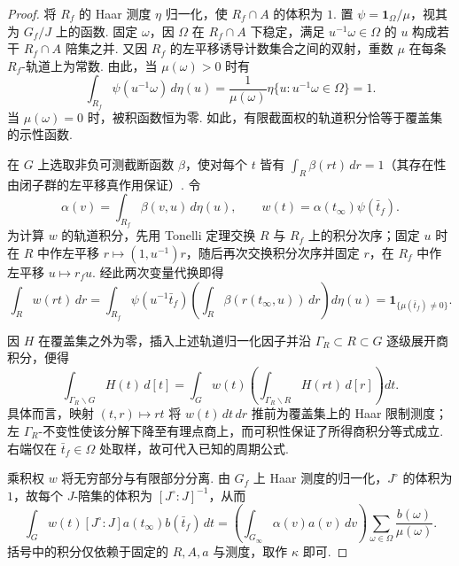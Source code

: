 \begin{proof}
将 $R_f$ 的 Haar 测度 $\eta$ 归一化，使 $R_f\cap A$ 的体积为 $1$. 置 $\psi=\mathbf 1_\Omega/\mu$，视其为 $G_f/J$ 上的函数. 固定 $\omega$，因 $\Omega$ 在 $R_f\cap A$ 下稳定，满足 $u^{-1}\omega\in\Omega$ 的 $u$ 构成若干 $R_f\cap A$ 陪集之并. 又因 $R_f$ 的左平移诱导计数集合之间的双射，重数 $\mu$ 在每条 $R_f$-轨道上为常数. 由此，当 $\mu(\omega)>0$ 时有
\[
 \int_{R_f}\psi(u^{-1}\omega)\,d\eta(u)
   =\frac{1}{\mu(\omega)}\eta\{u:u^{-1}\omega\in\Omega\}
   =1.
\]
当 $\mu(\omega)=0$ 时，被积函数恒为零. 如此，有限截面权的轨道积分恰等于覆盖集的示性函数.

在 $G$ 上选取非负可测截断函数 $\beta$，使对每个 $t$ 皆有 $\int_R\beta(rt)\,dr=1$（其存在性由闭子群的左平移真作用保证）. 令
\[
 \alpha(v)=\int_{R_f}\beta(v,u)\,d\eta(u),\qquad
 w(t)=\alpha(t_\infty)\psi(\bar t_f).
\]
为计算 $w$ 的轨道积分，先用 Tonelli 定理交换 $R$ 与 $R_f$ 上的积分次序；固定 $u$ 时在 $R$ 中作左平移 $r\mapsto(1,u^{-1})r$，随后再次交换积分次序并固定 $r$，在 $R_f$ 中作左平移 $u\mapsto r_fu$. 经此两次变量代换即得
\[
 \int_R w(rt)\,dr
   =\int_{R_f}\psi(u^{-1}\bar t_f)
                 \left(\int_R\beta(r(t_\infty,u))\,dr\right)d\eta(u)
   =\mathbf 1_{\{\mu(\bar t_f)\ne0\}}.
\]

因 $H$ 在覆盖集之外为零，插入上述轨道归一化因子并沿 $\Gamma_R\subset R\subset G$ 逐级展开商积分，便得
\[
 \int_{\Gamma_R\backslash G}H(t)\,d[t]
   =\int_G w(t)\left(\int_{\Gamma_R\backslash R}H(rt)\,d[r]\right)dt .
\]
具体而言，映射 $(t,r)\mapsto rt$ 将 $w(t)\,dt\,dr$ 推前为覆盖集上的 Haar 限制测度；左 $\Gamma_R$-不变性使该分解下降至有理点商上，而可积性保证了所得商积分等式成立. 右端仅在 $\bar t_f\in\Omega$ 处取样，故可代入已知的周期公式.

乘积权 $w$ 将无穷部分与有限部分分离. 由 $G_f$ 上 Haar 测度的归一化，$J^\circ$ 的体积为 $1$，故每个 $J$-陪集的体积为 $[J^\circ:J]^{-1}$，从而
\[
 \int_G w(t)[J^\circ:J]a(t_\infty)b(\bar t_f)\,dt
   =\left(\int_{G_\infty}\alpha(v)a(v)\,dv\right)
      \sum_{\omega\in\Omega}\frac{b(\omega)}{\mu(\omega)} .
\]
括号中的积分仅依赖于固定的 $R,A,a$ 与测度，取作 $\kappa$ 即可.
\end{proof}

